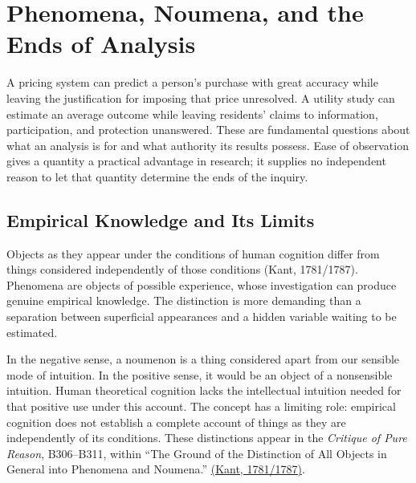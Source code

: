
\hypertarget{M09-phenomena-noumena-and-the-ends-of-analysis}{%
\section{Phenomena, Noumena, and the Ends of
Analysis}\label{M09-phenomena-noumena-and-the-ends-of-analysis}}

\noindent \noindent A pricing system can predict a person's purchase with great
accuracy while leaving the justification for imposing that price
unresolved. A utility study can estimate an average outcome while
leaving residents' claims to information, participation, and protection
unanswered. These are fundamental questions about what an analysis is
for and what authority its results possess. Ease of observation gives a
quantity a practical advantage in research; it supplies no independent
reason to let that quantity determine the ends of the inquiry.

\hypertarget{M09-empirical-knowledge-and-its-limits}{%
\subsection{Empirical Knowledge and Its
Limits}\label{M09-empirical-knowledge-and-its-limits}}

\noindent \noindent Objects as they appear under the conditions of human cognition
differ from things considered independently of those conditions (Kant,
1781/1787). Phenomena are objects of possible experience, whose
investigation can produce genuine empirical knowledge. The distinction
is more demanding than a separation between superficial appearances and
a hidden variable waiting to be estimated.

In the negative sense, a noumenon is a thing considered apart from our
sensible mode of intuition. In the positive sense, it would be an object
of a nonsensible intuition. Human theoretical cognition lacks the
intellectual intuition needed for that positive use under this account.
The concept has a limiting role: empirical cognition does not establish
a complete account of things as they are independently of its
conditions. These distinctions appear in the \emph{Critique of Pure
Reason}, B306--B311, within ``The Ground of the Distinction of All
Objects in General into Phenomena and Noumena.''
\href{../01_Resources/15_Marketing_Dialectics/01_Kant_Primary_Texts/public_domain_texts/Kant_CritiqueOfPureReason_Meiklejohn1855.html}{(Kant,
1781/1787)}.

